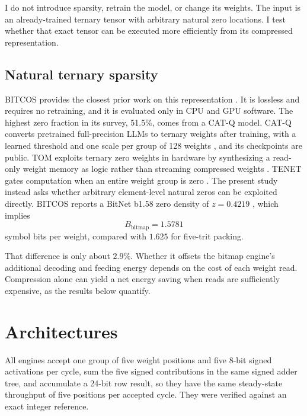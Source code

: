 \documentclass[11pt]{article}
\begin{document}
I do not introduce sparsity, retrain the model, or change its weights. The input is an already-trained ternary tensor with arbitrary natural zero locations. I test whether that exact tensor can be executed more efficiently from its compressed representation.

\subsection{Natural ternary sparsity}

BITCOS provides the closest prior work on this representation \cite{georganas2026bitcos}. It is lossless and requires no retraining, and it is evaluated only in CPU and GPU software. The highest zero fraction in its survey, 51.5\%, comes from a CAT-Q model. CAT-Q converts pretrained full-precision LLMs to ternary weights after training, with a learned threshold and one scale per group of 128 weights \cite{wang2026catq}, and its checkpoints are public. TOM exploits ternary zero weights in hardware by synthesizing a read-only weight memory as logic rather than streaming compressed weights \cite{guan2026tom}. TENET gates computation when an entire weight group is zero \cite{huang2025tenet}. The present study instead asks whether arbitrary element-level natural zeros can be exploited directly. BITCOS reports a BitNet b1.58 zero density of $z=0.4219$ \cite{georganas2026bitcos}, which implies
\begin{equation}
B_{\mathrm{bitmap}}=1.5781
\end{equation}
symbol bits per weight, compared with $1.625$ for five-trit packing.

That difference is only about $2.9\%$. Whether it offsets the bitmap engine's additional decoding and feeding energy depends on the cost of each weight read. Compression alone can yield a net energy saving when reads are sufficiently expensive, as the results below quantify.

\section{Architectures}
\label{sec:arch}

All engines accept one group of five weight positions and five 8-bit signed activations per cycle, sum the five signed contributions in the same signed adder tree, and accumulate a 24-bit row result, so they have the same steady-state throughput of five positions per accepted cycle. They were verified against an exact integer reference.
\end{document}
